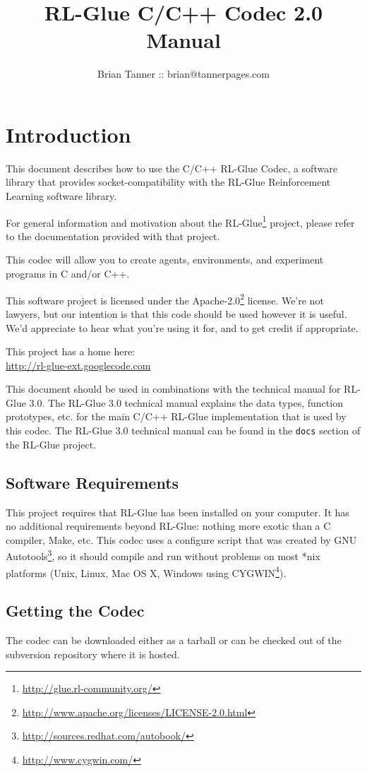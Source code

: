 \documentclass[11pt]{article}
\title{RL-Glue C/C++ Codec 2.0 Manual }
\author{Brian Tanner :: brian@tannerpages.com}
\date{}
\begin{document}
\maketitle
\tableofcontents

\section{Introduction}

This document describes how to use the C/C++ RL-Glue Codec, a software library that provides socket-compatibility with the RL-Glue Reinforcement Learning software library.  

For general information and motivation about the RL-Glue\footnote{\url{http://glue.rl-community.org/}} project, please refer to the documentation provided with that project.

This codec will allow you to create agents, environments, and experiment programs in C and/or C++.

This software project is licensed under the Apache-2.0\footnote{\url{http://www.apache.org/licenses/LICENSE-2.0.html}} license. We're not lawyers, but our intention is that this code 
should be used however it is useful.  We'd appreciate to hear what you're using it for, and to get credit if appropriate.

This project has a home here:\\
\url{http://rl-glue-ext.googlecode.com}

This document should be used in combinations with the technical manual for RL-Glue 3.0.  The RL-Glue 3.0 technical manual explains the data types, function prototypes, etc. for the main C/C++ RL-Glue implementation that is used
by this codec.  The RL-Glue 3.0 technical manual can be found in the \texttt{docs} section of the RL-Glue project.

\subsection{Software Requirements}
This project requires that RL-Glue has been installed on your computer.  It has no additional requirements beyond RL-Glue: nothing more exotic than a C compiler, Make, etc.  This codec uses a configure script that was created by GNU Autotools\footnote{\url{http://sources.redhat.com/autobook/}}, so it should compile and run without problems on most *nix platforms (Unix, Linux, Mac OS X, Windows using CYGWIN\footnote{\url{http://www.cygwin.com/}}). 

\subsection{Getting the Codec}
The codec can be downloaded either as a tarball or can be checked out of the subversion repository where it is hosted.
\end{document}
